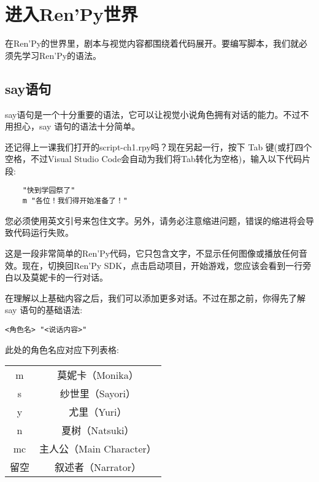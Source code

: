 \section{进入Ren'Py世界}
在Ren'Py的世界里，剧本与视觉内容都围绕着代码展开。要编写脚本，我们就必须先学习Ren'Py的语法。
\subsection{say语句}\label{subsec:2.2.1}
say语句是一个十分重要的语法，它可以让视觉小说角色拥有对话的能力。不过不用担心，say
语句的语法十分简单。

还记得上一课我们打开的script-ch1.rpy吗？现在另起一行，按下 Tab 键(或打四个空格，不过Visual Studio Code会自动为我们将Tab转化为空格)，输入以下代码片段:

\begin{lstlisting}
    "快到学园祭了"
    m "各位！我们得开始准备了！"
\end{lstlisting}

\begin{Warning}
您必须使用英文引号来包住文字。另外，请务必注意缩进问题，错误的缩进将会导致代码运行失败。
\end{Warning}

这是一段非常简单的Ren'Py代码，它只包含文字，不显示任何图像或播放任何音效。现在，切换回Ren'Py SDK，点击启动项目，开始游戏，您应该会看到一行旁白以及莫妮卡的一行对话。

在理解以上基础内容之后，我们可以添加更多对话。不过在那之前，你得先了解 say 语句的基础语法:

\begin{lstlisting}[numbers=none]
<角色名> "<说话内容>"
\end{lstlisting}


此处的角色名应对应下列表格:

\begin{center}
    \tabletail{\hline}
    \tablelasttail{\hline}
    \begin{supertabular}{|c|c|}
        \hline
        m & 莫妮卡（Monika）\\
        s & 纱世里（Sayori）\\
        y & 尤里（Yuri）\\
        n & 夏树（Natsuki）\\
        mc & 主人公（Main Character）\\
        留空 & 叙述者（Narrator）\\
        \hline
    \end{supertabular}
\end{center}

